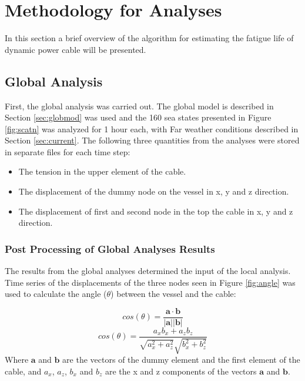 \chapter{Methodology for Analyses}
\label{chap:estimation}
In this section a brief overview of the algorithm for estimating the fatigue life of dynamic power cable will be presented. 
\section{Global Analysis}
First, the global analysis was carried out. The global model is described in Section \ref{sec:globmod} was used and the 160 sea states presented in Figure \ref{fig:scatn} was analyzed for 1 hour each, with Far weather conditions described in Section \ref{sec:current}. The following three quantities from the analyses were stored in separate files for each time step:
\begin{itemize}
    \item The  tension in the upper element of the cable.
    \item The displacement of the dummy node on the vessel in x, y and z direction.
    \item The  displacement of first and second node in the top the cable in x, y and z direction.
\end{itemize}

\subsection{Post Processing of Global Analyses Results}
The results from the global analyses determined the input of the local analysis. Time series of the displacements of the three nodes seen in Figure \ref{fig:angle} was used to calculate the angle ($\theta$) between the vessel and the cable: 

\begin{equation}
    cos(\theta) = \frac{\boldsymbol{a \cdot b}}{|\boldsymbol{a}||\boldsymbol{b}| }
\end{equation}
\begin{equation}
    cos(\theta) = \frac{a_x b_x + a_z b_z}{\sqrt{a_x^2 +a_z^2}\sqrt{b_x^2 +b_z^2}}
\end{equation}
Where $\boldsymbol{a}$ and $\boldsymbol{b}$ are the vectors of the dummy element and the first element of the cable, and $a_x$, $a_z$, $b_x$ and $b_z$ are the x and z components of the vectors $\boldsymbol{a}$ and $\boldsymbol{b}$. 

